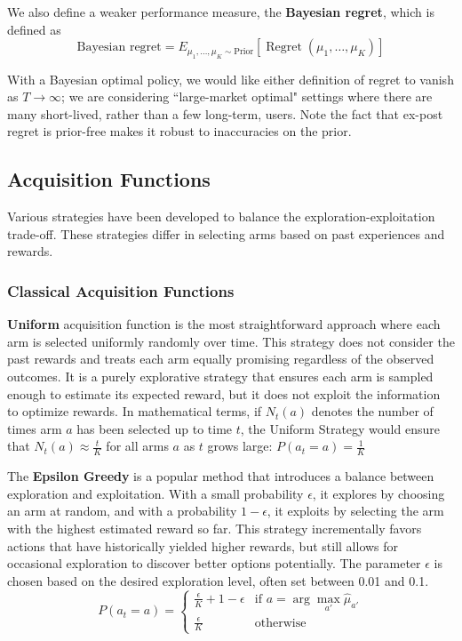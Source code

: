 \documentclass[
  letterpaper,
  numbers=noenddot,
  DIV=11]{scrreprt}
\theoremstyle{plain}
\theoremstyle{definition}
\theoremstyle{remark}
\begin{document}
We also define a weaker performance measure, the \textbf{Bayesian
regret}, which is defined as
\[\text {Bayesian regret}=E_{\mu_1, \ldots, \mu_K \sim \text {Prior}}\left[\operatorname{Regret}\left(\mu_1, \ldots, \mu_K\right)\right]\]

With a Bayesian optimal policy, we would like either definition of
regret to vanish as \(T\to \infty\); we are considering ``large-market
optimal" settings where there are many short-lived, rather than a few
long-term, users. Note the fact that ex-post regret is prior-free makes
it robust to inaccuracies on the prior.

\subsection{Acquisition Functions}\label{acquisition-functions}

Various strategies have been developed to balance the
exploration-exploitation trade-off. These strategies differ in selecting
arms based on past experiences and rewards.

\subsubsection{Classical Acquisition
Functions}\label{classical-acquisition-functions}

\textbf{Uniform} acquisition function is the most straightforward
approach where each arm is selected uniformly randomly over time. This
strategy does not consider the past rewards and treats each arm equally
promising regardless of the observed outcomes. It is a purely
explorative strategy that ensures each arm is sampled enough to estimate
its expected reward, but it does not exploit the information to optimize
rewards. In mathematical terms, if \(N_t(a)\) denotes the number of
times arm \(a\) has been selected up to time \(t\), the Uniform Strategy
would ensure that \(N_t(a) \approx \frac{t}{K}\) for all arms \(a\) as
\(t\) grows large: \(P(a_t = a) = \frac{1}{K}\)

The \textbf{Epsilon Greedy} is a popular method that introduces a
balance between exploration and exploitation. With a small probability
\(\epsilon\), it explores by choosing an arm at random, and with a
probability \(1 - \epsilon\), it exploits by selecting the arm with the
highest estimated reward so far. This strategy incrementally favors
actions that have historically yielded higher rewards, but still allows
for occasional exploration to discover better options potentially. The
parameter \(\epsilon\) is chosen based on the desired exploration level,
often set between 0.01 and 0.1. \[P(a_t = a) =
\begin{cases} 
\frac{\epsilon}{K} + 1 - \epsilon & \text{if } a = \arg\max_{a'} \hat{\mu}_{a'} \\
\frac{\epsilon}{K} & \text{otherwise}
\end{cases}\]
\end{document}
